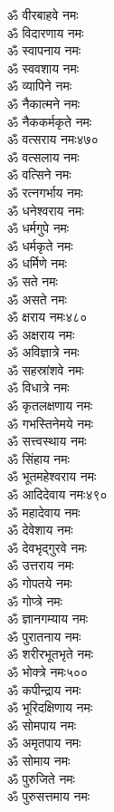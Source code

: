 \begin{center}
\begin{multicols}{2}
\begin{flushleft}
ॐ वीरबाहवे नमः\\
ॐ विदारणाय नमः\\
ॐ स्वापनाय नमः\\
ॐ स्ववशाय नमः\\
ॐ व्यापिने नमः\\
ॐ नैकात्मने नमः\\
ॐ नैककर्मकृते नमः\\
ॐ वत्सराय नमः\hfill ४७०\\
ॐ वत्सलाय नमः\\
ॐ वत्सिने नमः\\
ॐ रत्नगर्भाय नमः\\
ॐ धनेश्वराय नमः\\
ॐ धर्मगुपे नमः\\
ॐ धर्मकृते नमः\\
ॐ धर्मिणे नमः\\
ॐ सते नमः\\
ॐ असते नमः\\
ॐ क्षराय नमः\hfill ४८०\\
ॐ अक्षराय नमः\\
ॐ अविज्ञात्रे नमः\\
ॐ सहस्रांशवे नमः\\
ॐ विधात्रे नमः\\
ॐ कृतलक्षणाय नमः\\
ॐ गभस्तिनेमये नमः\\
ॐ सत्त्वस्थाय नमः\\
ॐ सिंहाय नमः\\
ॐ भूतमहेश्वराय नमः\\
ॐ आदिदेवाय नमः\hfill ४९०\\
ॐ महादेवाय नमः\\
ॐ देवेशाय नमः\\
ॐ देवभृद्गुरवे नमः\\
ॐ उत्तराय नमः\\
ॐ गोपतये नमः\\
ॐ गोप्त्रे नमः\\
ॐ ज्ञानगम्याय नमः\\
ॐ पुरातनाय नमः\\
ॐ शरीरभूतभृते नमः\\
ॐ भोक्त्रे नमः\hfill ५००\\
ॐ कपीन्द्राय नमः\\
ॐ भूरिदक्षिणाय नमः\\
ॐ सोमपाय नमः\\
ॐ अमृतपाय नमः\\
ॐ सोमाय नमः\\
ॐ पुरुजिते नमः\\
ॐ पुरुसत्तमाय नमः\\

\end{flushleft}
\end{multicols}
\end{center}
